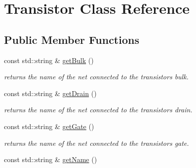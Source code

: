 \hypertarget{class_open_chams_1_1_transistor}{}\section{Transistor Class Reference}
\label{class_open_chams_1_1_transistor}
\subsection*{Public Member Functions}
\begin{DoxyCompactItemize}
\item 
\mbox{\label{class_open_chams_1_1_transistor_a27ba43f825f9243556ec65d306a2b1a7}} 
const std\+::string \& \mbox{\hyperlink{class_open_chams_1_1_transistor_a27ba43f825f9243556ec65d306a2b1a7}{get\+Bulk}} ()
\begin{DoxyCompactList}\small\item\em returns the name of the net connected to the transistor\textquotesingle{}s bulk. \end{DoxyCompactList}\item 
\mbox{\label{class_open_chams_1_1_transistor_a62ea0998b3a61310a8331873f5bcce58}} 
const std\+::string \& \mbox{\hyperlink{class_open_chams_1_1_transistor_a62ea0998b3a61310a8331873f5bcce58}{get\+Drain}} ()
\begin{DoxyCompactList}\small\item\em returns the name of the net connected to the transistor\textquotesingle{}s drain. \end{DoxyCompactList}\item 
\mbox{\label{class_open_chams_1_1_transistor_a99f1449aa735ff6cb4927b4f6aa34d9d}} 
const std\+::string \& \mbox{\hyperlink{class_open_chams_1_1_transistor_a99f1449aa735ff6cb4927b4f6aa34d9d}{get\+Gate}} ()
\begin{DoxyCompactList}\small\item\em returns the name of the net connected to the transistor\textquotesingle{}s gate. \end{DoxyCompactList}\item 
\mbox{\label{class_open_chams_1_1_transistor_a2858c0c4e8b5108f041237cf5a802029}} 
const std\+::string \& \mbox{\hyperlink{class_open_chams_1_1_transistor_a2858c0c4e8b5108f041237cf5a802029}{get\+Name}} ()

\end{DoxyCompactItemize}
